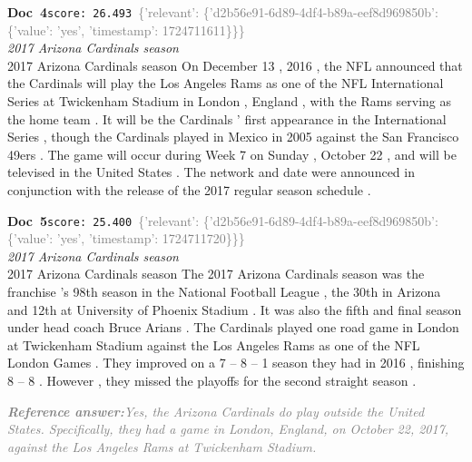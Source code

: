 \documentclass[a4paper,11pt]{article}
\begin{document}
\begin{docenv}
{\footnotesize\textcolor{doccolor}{\textbf{Doc~4}}}\hfill{\tiny\texttt{score:~26.493}}\ {\tiny\textcolor{gray}{\{'relevant': \{'d2b56e91-6d89-4df4-b89a-eef8d969850b': \{'value': 'yes', 'timestamp': 1724711611\}\}\}}}\\[3pt]
{\small\textit{2017 Arizona Cardinals season}}\\[2pt]
\vspace{2pt}
{\footnotesize 2017 Arizona Cardinals season
On December 13 , 2016 , the NFL announced that the Cardinals will play the Los Angeles Rams as one of the NFL International Series at Twickenham Stadium in London , England , with the Rams serving as the home team . It will be the Cardinals ' first appearance in the International Series , though the Cardinals played in Mexico in 2005 against the San Francisco 49ers . The game will occur during Week 7 on Sunday , October 22 , and will be televised in the United States . The network and date were announced in conjunction with the release of the 2017 regular season schedule .}
\end{docenv}
\begin{docenv}
{\footnotesize\textcolor{doccolor}{\textbf{Doc~5}}}\hfill{\tiny\texttt{score:~25.400}}\ {\tiny\textcolor{gray}{\{'relevant': \{'d2b56e91-6d89-4df4-b89a-eef8d969850b': \{'value': 'yes', 'timestamp': 1724711720\}\}\}}}\\[3pt]
{\small\textit{2017 Arizona Cardinals season}}\\[2pt]
\vspace{2pt}
{\footnotesize 2017 Arizona Cardinals season
The 2017 Arizona Cardinals season was the franchise 's 98th season in the National Football League , the 30th in Arizona and 12th at University of Phoenix Stadium . It was also the fifth and final season under head coach Bruce Arians . The Cardinals played one road game in London at Twickenham Stadium against the Los Angeles Rams as one of the NFL London Games . They improved on a 7 -- 8 -- 1 season they had in 2016 , finishing 8 -- 8 . However , they missed the playoffs for the second straight season .}
\end{docenv}
\begin{refanswerenv}
{\footnotesize\textit{\textcolor{gray}{\textbf{Reference answer:}\enspace Yes, the Arizona Cardinals do play outside the United States. Specifically, they had a game in London, England, on October 22, 2017, against the Los Angeles Rams at Twickenham Stadium.}}}
\end{refanswerenv}
\end{document}
